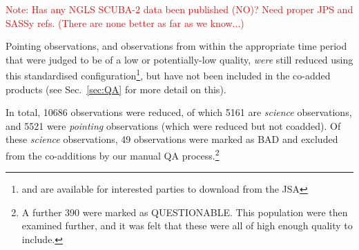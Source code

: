 \documentclass[usenatbib]{mnras}
\newcommand{\sref}[1]{Sec.~\ref{#1}}
\newcommand{\note}[1]{\textcolor{red}{Note: #1}}
\newcommand{\status}[1]{\textsf{#1}}
\begin{document}
\note{Has any NGLS SCUBA-2 data been published (NO)? Need proper JPS and
  SASSy refs. (There are none better as far as we know...)}

Pointing observations, and observations from within the
appropriate time period that were judged to be of a low or
potentially-low quality, \emph{were} still reduced using this
standardised configuration\footnote{and are available for interested
  parties to download from the JSA}, but have not been included in the
co-added products (see \sref{sec:QA} for more detail on this).

In total, 10686 observations were reduced, of which 5161 are
\emph{science} observations, and 5521 were \emph{pointing}
observations (which were reduced but not coadded).  Of these
\emph{science} observations, 49 observations were marked as
\status{BAD} and excluded from the co-additions by our manual QA
process.\footnote{A further 390 were marked as
  \status{QUESTIONABLE}. This population were then examined further,
  and it was felt that these were all of high enough quality to
  include.}
\end{document}
